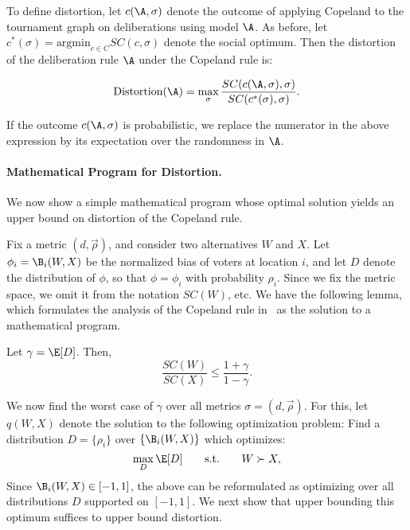 To define distortion, %
let $c(\A,\sigma)$ denote the outcome of applying Copeland to the tournament graph on deliberations using model $\A$. As before, let $c^*(\sigma) = \mbox{argmin}_{c \in C} SC(c,\sigma)$ denote the social optimum. Then the distortion of the deliberation rule $\A$ under the Copeland rule is:

$$\mbox{Distortion}(\A) = \max_{\sigma}  \frac{SC(c(\A,\sigma), \sigma)}{SC(c^*(\sigma),\sigma)}.$$

If the outcome $c(\A,\sigma)$ is probabilistic, we replace the numerator in the above expression by its expectation over the randomness in $\A$.

\paragraph{Mathematical Program for Distortion.} We now show a simple mathematical program whose optimal solution yields an upper bound on distortion of the Copeland rule.

Fix a metric $(d ,\vec{\rho})$, and consider two alternatives $W$ and $X$. Let $\phi_i = \B_i(W,X)$ be the normalized bias of voters at location $i$, and let $D$ denote the distribution of $\phi$, so that $\phi = \phi_i$ with probability $\rho_i$. Since we fix the metric space, we omit it from the notation $SC(W)$, etc. We have the following lemma, which formulates the analysis of the Copeland rule in~\cite{AnshelevichBEPS18} as the solution to a mathematical program.

\begin{lemma} 
\label{lem1}
Let $\gamma = \E[D]$. Then,
$$ \frac{SC(W)}{SC(X)} \le \frac{1+\gamma}{1-\gamma}.$$
\end{lemma}


We now find the worst case of $\gamma$ over all metrics $\sigma = (d, \vec{\rho})$. For this, let $q(W,X)$ denote the solution to the following optimization problem: Find a distribution $D = \{\rho_i\}$ over $\{\B_i(W,X)\}$ which optimizes:
\begin{equation} 
\label{eq:opt}
\max_D \E[D] \qquad \mbox{s.t.} \qquad W \succ X,
\end{equation}
Since $\B_i(W,X) \in [-1,1]$, the above can be reformulated as optimizing over all distributions $D$ supported on $[-1,1]$.  We next show that upper bounding this optimum  suffices to upper bound distortion. 

